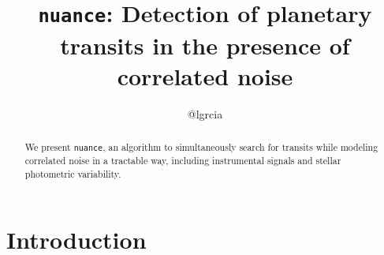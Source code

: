 \documentclass{aastex631}
\begin{document}
\title{\texttt{nuance}: Detection of planetary transits in the presence of correlated noise}

\author{@lgrcia}

\begin{abstract}
    We present \texttt{nuance}, an algorithm to simultaneously search for transits while modeling correlated noise in a tractable way, including instrumental signals and stellar photometric variability.
\end{abstract}

\section*{Introduction}
\label{sec:intro}
\end{document}
